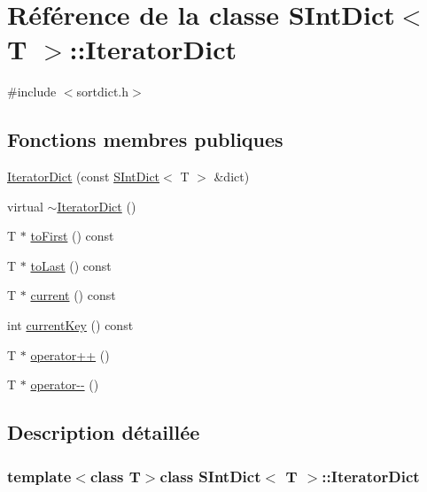 \hypertarget{class_s_int_dict_1_1_iterator_dict}{}\section{Référence de la classe S\+Int\+Dict$<$ T $>$\+:\+:Iterator\+Dict}
\label{class_s_int_dict_1_1_iterator_dict}


{\ttfamily \#include $<$sortdict.\+h$>$}

\subsection*{Fonctions membres publiques}
\begin{DoxyCompactItemize}
\item 
\hyperlink{class_s_int_dict_1_1_iterator_dict_a6bbd7ab69b3df8c5c1a2bc2e4efea152}{Iterator\+Dict} (const \hyperlink{class_s_int_dict}{S\+Int\+Dict}$<$ T $>$ \&dict)
\item 
virtual \hyperlink{class_s_int_dict_1_1_iterator_dict_af37503cbd054f367959b0343bf172fd9}{$\sim$\+Iterator\+Dict} ()
\item 
T $\ast$ \hyperlink{class_s_int_dict_1_1_iterator_dict_a74326f6332dbe067fe520e22404335f4}{to\+First} () const 
\item 
T $\ast$ \hyperlink{class_s_int_dict_1_1_iterator_dict_a7a2111c6c0862c0502360d2a9045402a}{to\+Last} () const 
\item 
T $\ast$ \hyperlink{class_s_int_dict_1_1_iterator_dict_a140b0c4b34819d191a99a748ae06f30e}{current} () const 
\item 
int \hyperlink{class_s_int_dict_1_1_iterator_dict_ae28780e008142ec1eaf0763f045d2b26}{current\+Key} () const 
\item 
T $\ast$ \hyperlink{class_s_int_dict_1_1_iterator_dict_a4f7cc0bad139d87c2730964f89628e2d}{operator++} ()
\item 
T $\ast$ \hyperlink{class_s_int_dict_1_1_iterator_dict_aa68b38ab392a260b9a5b2c8b06f1b17b}{operator-\/-\/} ()
\end{DoxyCompactItemize}


\subsection{Description détaillée}
\subsubsection*{template$<$class T$>$class S\+Int\+Dict$<$ T $>$\+::\+Iterator\+Dict}

